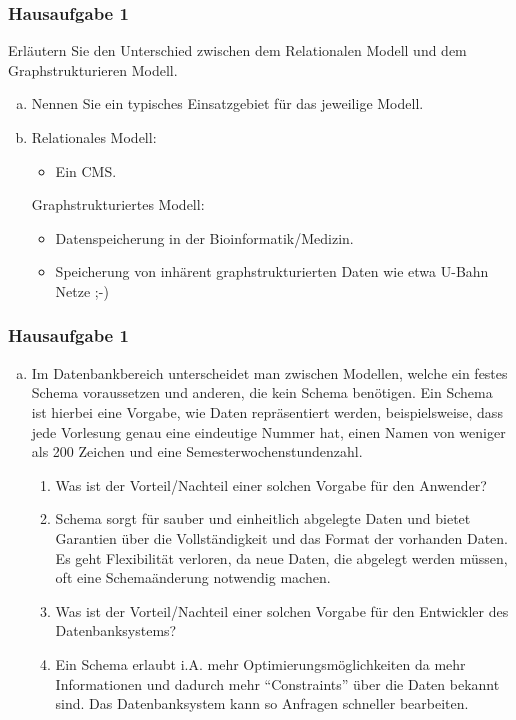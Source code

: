 \begin{frame}
	\frametitle{Hausaufgabe 1}
	\vspace{0.5cm}

	Erläutern Sie den Unterschied zwischen dem Relationalen Modell und dem Graphstrukturieren Modell.
	\begin{enumerate}[a)]
		\item<1-> Nennen Sie ein typisches Einsatzgebiet für das jeweilige Modell.
		\item<2->[]
		      Relationales Modell:
		      \begin{itemize}
			      \item Ein CMS.
		      \end{itemize}
		      Graphstrukturiertes Modell:
		      \begin{itemize}
			      \item Datenspeicherung in der Bioinformatik/Medizin.
			      \item Speicherung von inhärent graphstrukturierten Daten wie etwa U-Bahn Netze ;-)
		      \end{itemize}
	\end{enumerate}
\end{frame}

\begin{frame}
	\frametitle{Hausaufgabe 1}
	\vspace{0.5cm}

	\begin{enumerate}[b)]
		\item<1-> Im Datenbankbereich unterscheidet man zwischen Modellen,
		      welche ein festes Schema voraussetzen und anderen,
		      die kein Schema benötigen. Ein Schema ist hierbei eine Vorgabe,
		      wie Daten repräsentiert werden, beispielsweise, dass jede Vorlesung genau
		      eine eindeutige Nummer hat, einen Namen von weniger als 200 Zeichen und eine
		      Semesterwochenstundenzahl.
		      \begin{enumerate}[1)]
			      \item<1-> Was ist der Vorteil/Nachteil einer solchen Vorgabe für den Anwender?
			      \item<2->[] Schema sorgt für sauber und einheitlich abgelegte Daten
			            und bietet Garantien über die Vollständigkeit und das Format der vorhanden Daten.
			            Es geht Flexibilität verloren, da neue Daten, die abgelegt werden müssen,
			            oft eine Schemaänderung notwendig machen.
			      \item<1-> Was ist der Vorteil/Nachteil einer solchen Vorgabe für den Entwickler des
			            Datenbanksystems?
			      \item<2->[] Ein Schema erlaubt i.A. mehr Optimierungsmöglichkeiten da mehr Informationen
			            und dadurch mehr “Constraints” über die Daten bekannt sind.
			            Das Datenbanksystem kann so Anfragen schneller bearbeiten.
		      \end{enumerate}
	\end{enumerate}
\end{frame}

